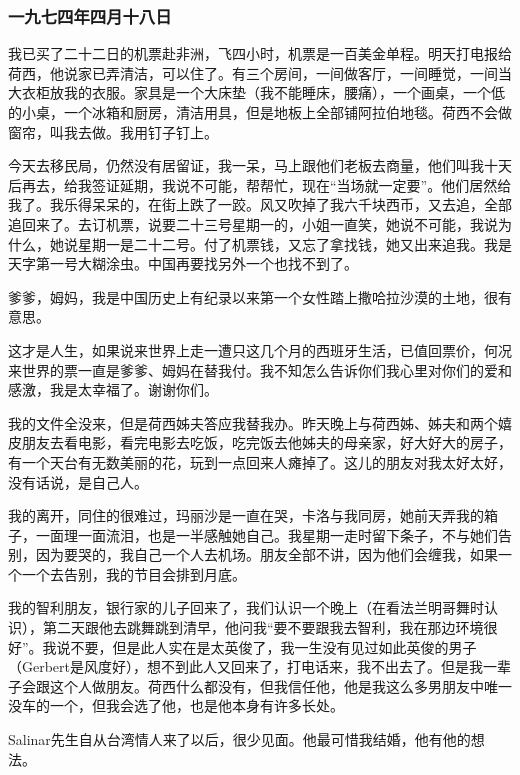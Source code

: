 \subsubsection{一九七四年四月十八日}

\par {}
\par 我已买了二十二日的机票赴非洲，飞四小时，机票是一百美金单程。明天打电报给荷西，他说家已弄清洁，可以住了。有三个房间，一间做客厅，一间睡觉，一间当大衣柜放我的衣服。家具是一个大床垫（我不能睡床，腰痛），一个画桌，一个低的小桌，一个冰箱和厨房，清洁用具，但是地板上全部铺阿拉伯地毯。荷西不会做窗帘，叫我去做。我用钉子钉上。
\par 今天去移民局，仍然没有居留证，我一呆，马上跟他们老板去商量，他们叫我十天后再去，给我签证延期，我说不可能，帮帮忙，现在“当场就一定要”。他们居然给我了。我乐得呆呆的，在街上跌了一跤。风又吹掉了我六千块西币，又去追，全部追回来了。去订机票，说要二十三号星期一的，小姐一直笑，她说不可能，我说为什么，她说星期一是二十二号。付了机票钱，又忘了拿找钱，她又出来追我。我是天字第一号大糊涂虫。中国再要找另外一个也找不到了。
\par 爹爹，姆妈，我是中国历史上有纪录以来第一个女性踏上撒哈拉沙漠的土地，很有意思。
\par 这才是人生，如果说来世界上走一遭只这几个月的西班牙生活，已值回票价，何况来世界的票一直是爹爹、姆妈在替我付。我不知怎么告诉你们我心里对你们的爱和感激，我是太幸福了。谢谢你们。
\par 我的文件全没来，但是荷西姊夫答应我替我办。昨天晚上与荷西姊、姊夫和两个嬉皮朋友去看电影，看完电影去吃饭，吃完饭去他姊夫的母亲家，好大好大的房子，有一个天台有无数美丽的花，玩到一点回来人瘫掉了。这儿的朋友对我太好太好，没有话说，是自己人。
\par 我的离开，同住的很难过，玛丽沙是一直在哭，卡洛与我同房，她前天弄我的箱子，一面理一面流泪，也是一半感触她自己。我星期一走时留下条子，不与她们告别，因为要哭的，我自己一个人去机场。朋友全部不讲，因为他们会缠我，如果一个一个去告别，我的节目会排到月底。
\par 我的智利朋友，银行家的儿子回来了，我们认识一个晚上（在看法兰明哥舞时认识），第二天跟他去跳舞跳到清早，他问我“要不要跟我去智利，我在那边环境很好”。我说不要，但是此人实在是太英俊了，我一生没有见过如此英俊的男子（Gerbert是风度好），想不到此人又回来了，打电话来，我不出去了。但是我一辈子会跟这个人做朋友。荷西什么都没有，但我信任他，他是我这么多男朋友中唯一没车的一个，但我会选了他，也是他本身有许多长处。
\par Salinar先生自从台湾情人来了以后，很少见面。他最可惜我结婚，他有他的想法。
